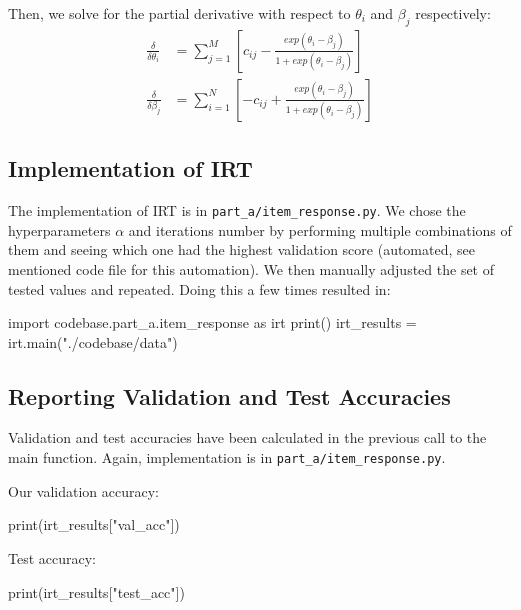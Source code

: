 \documentclass{article}
\begin{document}
    Then, we solve for the partial derivative with respect to $\theta_i$ and $\beta_j$ respectively:
    \begin{align*}
        \frac{\delta}{\delta\theta_{i}} &=  \sum_{j=1}^{M}{[c_{ij} - \frac{exp(\theta_{i} - \beta_{j})}{1+exp(\theta_{i} - \beta_{j})}]} \\
        \frac{\delta}{\delta\beta_{j}} &= \sum_{i=1}^{N}{[-c_{ij} + \frac{exp(\theta_{i} - \beta_{j})}{1+exp(\theta_{i} - \beta_{j})}]}
    \end{align*}
    
    \subsection{Implementation of IRT}
    The implementation of IRT is in \verb|part_a/item_response.py|. We chose the hyperparameters $\alpha$ and iterations number by performing multiple combinations of them and seeing which one had the highest validation score (automated, see mentioned code file for this automation). We then manually adjusted the set of tested values and repeated. Doing this a few times resulted in:

    \begin{pylabblock}
        import codebase.part_a.item_response as irt
        print()
        irt_results = irt.main("./codebase/data")
    \end{pylabblock}
    \printpythontex[verb]


    \medskip

    \subsection{Reporting Validation and Test Accuracies}

    Validation and test accuracies have been calculated in the previous call to the main function. Again, implementation is in \verb|part_a/item_response.py|.

    \medskip

    \noindent
    Our validation accuracy:
    \begin{pylabblock}
        print(irt_results["val_acc"])
    \end{pylabblock}
    \printpythontex[verb]

    \medskip

    \noindent
    Test accuracy:
    \begin{pylabblock}
        print(irt_results["test_acc"])
    \end{pylabblock}
    \printpythontex[verb]
\end{document}
